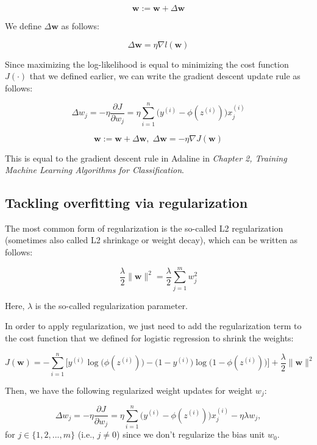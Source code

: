 \documentclass[letterpaper]{report}
\begin{document}
\[
\mathbf{w} := \mathbf{w} + \Delta \mathbf{w}
\]

We define $\Delta \mathbf{w}$ as follows:

\[
\Delta \mathbf{w} = \eta \nabla l (\mathbf{w})
\]

Since maximizing the log-likelihood is equal to minimizing the cost function $J(\cdot)$ that we defined earlier, we can write the gradient descent update rule as follows:

\[
\Delta w_j = - \eta \frac{\partial J}{\partial w_j} = \eta \sum_{i=1}^{n} \bigg( y^{(i)} - \phi(z^{(i)}) \bigg)x_{j}^{(i)}
\]

\[
\mathbf{w} := \mathbf{w} + \Delta \mathbf{w}, \; \Delta \mathbf{w} = - \eta \nabla J(\mathbf{w})
\]

This is equal to the gradient descent rule in Adaline in \textit{Chapter 2, Training Machine Learning Algorithms for Classification}.


\subsection{Tackling overfitting via regularization}

The most common form of regularization is the so-called L2 regularization (sometimes also called L2 shrinkage or weight decay), which can be written as follows:

\[
\frac{\lambda}{2} \lVert \mathbf{w} \rVert^2 = \frac{\lambda}{2} \sum_{j=1}^m w_{j}^{2}
\]

Here, $\lambda$ is the so-called regularization parameter.

In order to apply regularization, we just need to add the regularization term to the cost function that we defined for logistic regression to shrink the weights:

\[
J(\mathbf{w}) = - \sum_{i=1}^{n} \bigg[  y^{(i)} \log \big(  \phi(z^{(i)})  \big)  - \big( 1 - y ^{(i)} \big)  \log \big( 1 - \phi(z^{(i)})   \big)   \bigg] + \frac{\lambda}{2} \lVert \mathbf{w}\rVert^2  
\]

Then, we have the following regularized weight updates for weight $w_j$:

\[
\Delta w_j  = - \eta \frac{\partial J}{\partial w_j} = \eta \sum_{i=1}^{n} \bigg( y^{(i)} - \phi(z^{(i)}) \bigg)x_{j}^{(i)} - \eta \lambda w_j,
\] for $j \in \{1, 2, ..., m \}$ (i.e., $j \neq 0 $) since we don't regularize the bias unit $w_0$. \\
\end{document}

